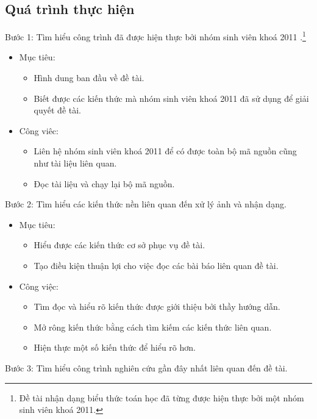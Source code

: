 \documentclass[a4paper,12pt]{article}
\begin{document}
	\subsection{Quá trình thực hiện}
	Bước 1: Tìm hiểu công trình đã được hiện thực bởi nhóm sinh viên khoá 2011 \cite{qak}.\footnote{Đề tài nhận dạng biểu thức toán học đã từng được hiện thực bởi một nhóm sinh viên khoá 2011.}
	\begin{itemize}
		\item Mục tiêu: 
		\begin{itemize}
			\item Hình dung ban đầu về đề tài.
			\item Biết được các kiến thức mà nhóm sinh viên khoá 2011 đã sử dụng để giải quyết đề tài.
		\end{itemize}
		\item Công viêc: 
		\begin{itemize}
			\item Liên hệ nhóm sinh viên khoá 2011 để có được toàn bộ mã nguồn cũng như tài liệu liên quan.
			\item Đọc tài liệu và chạy lại bộ mã nguồn.
		\end{itemize}
	\end{itemize}
	Bước 2: Tìm hiểu các kiến thức nền liên quan đến xử lý ảnh và nhận dạng.\\
	\begin{itemize}
		\item Mục tiêu: 
		\begin{itemize}
			\item Hiểu được các kiến thức cơ sở phục vụ đề tài.
			\item Tạo điều kiện thuận lợi cho việc đọc các bài báo liên quan đề tài.
			
		\end{itemize}
		\item Công việc:
		\begin{itemize}
			\item Tìm đọc và hiểu rõ kiến thức được giới thiệu bởi thầy hướng dẫn.
			\item Mở rông kiến thức bằng cách tìm kiếm các kiến thức liên quan.
			\item Hiện thực một số kiến thức để hiểu rõ hơn.
		\end{itemize}	
	\end{itemize}
	\vspace{1.5cm}
	Bước 3: Tìm hiểu công trình nghiên cứu gần đây nhất liên quan đến đề tài.
	
\end{document}
